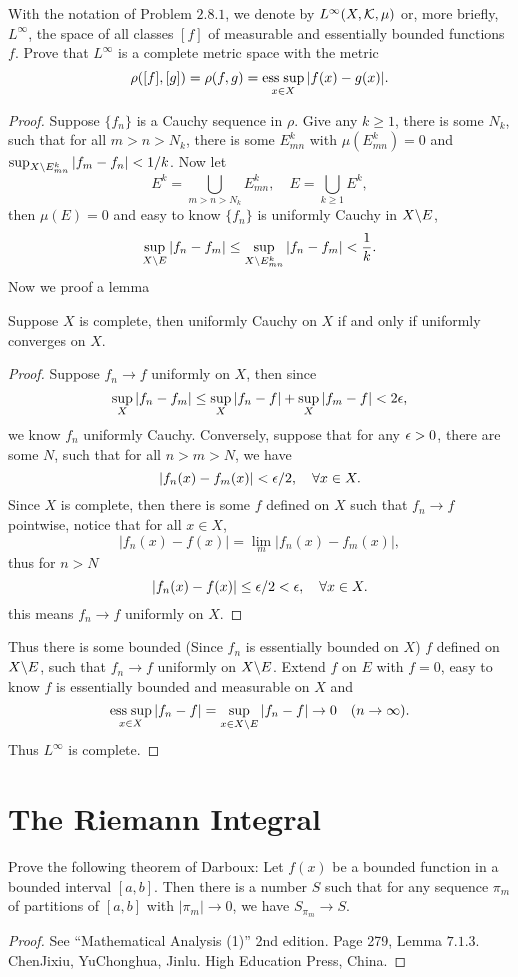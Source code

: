 \begin{pro}%
	With the notation of Problem $2.8.1$, we denote by $L^{\infty}(X,\mathcal{K},\mu)$ or, more briefly, $L^{\infty}$, the space of all classes $[f]$ of measurable and essentially bounded functions $f$. Prove that $L^{\infty}$ is a complete metric space with the metric
	\[\rho([f],[g])=\rho(f,g)=\operatorname*{ess\;sup}_{x\in X}|f(x)-g(x)|.\]
\end{pro}
\begin{proof}
	Suppose $\{f_n\}$ is a Cauchy sequence in $\rho$. Give any $k\geq 1$, there is some $N_k$, such that for all $m>n>N_k$, there is some $E_{mn}^k$ with $\mu(E_{mn}^k)=0$ and $\sup_{X\backslash E_{mn}^k}|f_m-f_n|<1/k$. Now let
	\[E^k=\bigcup_{m>n>N_k} E_{mn}^k,\quad E=\bigcup_{k\geq 1} E^k,\]
	then $\mu(E)=0$ and easy to know $\{f_n\}$ is uniformly Cauchy in $X\backslash E$,
	\[\sup_{X\backslash E}|f_n-f_m|\leq \sup_{X\backslash E_{mn}^k} |f_n-f_m|<\frac{1}{k}.\]
	Now we proof a lemma
	\begin{lem}
		Suppose $X$ is complete, then uniformly Cauchy on $X$ if and only if uniformly converges on $X$.
	\end{lem} 
	\begin{proof}
		Suppose $f_n\to f$ uniformly on $X$, then since
		\[\sup_X|f_n-f_m|\leq \sup_X|f_n-f|+\sup_X|f_m-f|<2\epsilon,\]
		we know $f_n$ uniformly Cauchy. Conversely, suppose that for any $\epsilon>0$, there are some $N$, such that for all $n>m>N$, we have
		\[|f_n(x)-f_m(x)|<\epsilon/2,\quad \forall x\in X.\]
		Since $X$ is complete, then there is some $f$ defined on $X$ such that $f_n\to f$ pointwise, notice that for all $x\in X$, 
		\[|f_n(x)-f(x)|=\lim_m|f_n(x)-f_m(x)|,\]
		thus for $n>N$
		\[|f_n(x)-f(x)|\leq \epsilon/2<\epsilon,\quad \forall x\in X.\]
		this means $f_n\to f$ uniformly on $X$.
	\end{proof}
	Thus there is some bounded (Since $f_n$ is essentially bounded on $X$) $f$ defined on $X\backslash E$, such that $f_n\to f$ uniformly on $X\backslash E$. Extend $f$ on $E$ with $f=0$, easy to know $f$ is essentially bounded and measurable on $X$ and
	\[\operatorname*{ess\;sup}_{x\in X}|f_n-f|=\sup_{x\in X\backslash E}|f_n-f|\to 0\quad(n\to\infty).\]
	Thus $L^{\infty}$ is complete.
\end{proof}

\section{The Riemann Integral}
\begin{pro}%
	Prove the following theorem of Darboux: Let $f(x)$ be a bounded function in a bounded interval $[a,b]$. Then there is a number $S$ such that for any sequence $\pi_m$ of partitions of $[a,b]$ with $|\pi_m|\to 0$, we have $S_{\pi_m}\to S$.
\end{pro}
\begin{proof}
	See ``Mathematical Analysis (1)'' 2nd edition. Page 279, Lemma $7.1.3$. ChenJixiu, YuChonghua, Jinlu. High Education Press, China. 
\end{proof}

